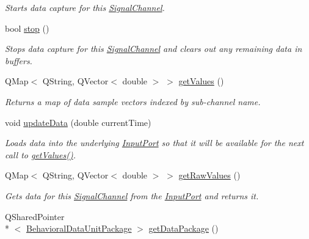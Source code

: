 \begin{DoxyCompactItemize}
\begin{DoxyCompactList}\small\item\em Starts data capture for this \hyperlink{class_picto_1_1_signal_channel}{Signal\-Channel}. \end{DoxyCompactList}\item 
\hypertarget{class_picto_1_1_signal_channel_ae359aef18212642b4c748f786f181f46}{bool \hyperlink{class_picto_1_1_signal_channel_ae359aef18212642b4c748f786f181f46}{stop} ()}\label{class_picto_1_1_signal_channel_ae359aef18212642b4c748f786f181f46}

\begin{DoxyCompactList}\small\item\em Stops data capture for this \hyperlink{class_picto_1_1_signal_channel}{Signal\-Channel} and clears out any remaining data in buffers. \end{DoxyCompactList}\item 
Q\-Map$<$ Q\-String, Q\-Vector$<$ double $>$ $>$ \hyperlink{class_picto_1_1_signal_channel_a6d3da16b7a2233f581617aabdb1c4c72}{get\-Values} ()
\begin{DoxyCompactList}\small\item\em Returns a map of data sample vectors indexed by sub-\/channel name. \end{DoxyCompactList}\item 
void \hyperlink{class_picto_1_1_signal_channel_a734076de8d92b65d138be9c5b47e24b9}{update\-Data} (double current\-Time)
\begin{DoxyCompactList}\small\item\em Loads data into the underlying \hyperlink{class_picto_1_1_input_port}{Input\-Port} so that it will be available for the next call to \hyperlink{class_picto_1_1_signal_channel_a6d3da16b7a2233f581617aabdb1c4c72}{get\-Values()}. \end{DoxyCompactList}\item 
Q\-Map$<$ Q\-String, Q\-Vector$<$ double $>$ $>$ \hyperlink{class_picto_1_1_signal_channel_a3c06dc4ca6a36b0e5397f0cc0ba1d520}{get\-Raw\-Values} ()
\begin{DoxyCompactList}\small\item\em Gets data for this \hyperlink{class_picto_1_1_signal_channel}{Signal\-Channel} from the \hyperlink{class_picto_1_1_input_port}{Input\-Port} and returns it. \end{DoxyCompactList}\item 
Q\-Shared\-Pointer\\*
$<$ \hyperlink{class_picto_1_1_behavioral_data_unit_package}{Behavioral\-Data\-Unit\-Package} $>$ \hyperlink{class_picto_1_1_signal_channel_af25895d869ccb7e0e5ba2294af82d1e3}{get\-Data\-Package} ()

\end{DoxyCompactItemize}
